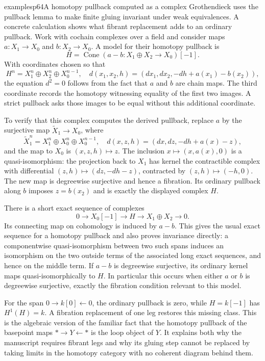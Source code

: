 \begin{dcomment}{examples}{p64}{A homotopy pullback computed as a complex}
Grothendieck uses the pullback lemma to make finite gluing invariant under weak equivalences. A concrete calculation shows what fibrant replacement adds to an ordinary pullback. Work with cochain complexes over a field and consider maps $a:X_1\to X_0$ and $b:X_2\to X_0$. A model for their homotopy pullback is
\[
 H=\operatorname{Cone}(a-b:X_1\oplus X_2\to X_0)[-1].
\]
With coordinates chosen so that
\[
 H^n=X_1^n\oplus X_2^n\oplus X_0^{n-1},
 \quad d(x_1,x_2,h)=(dx_1,dx_2,-dh+a(x_1)-b(x_2)),
\]
the equation $d^2=0$ follows from the fact that $a$ and $b$ are chain maps. The third coordinate records the homotopy witnessing equality of the first two images. A strict pullback asks those images to be equal without this additional coordinate.

To verify that this complex computes the derived pullback, replace $a$ by the surjective map $\widetilde X_1\to X_0$, where
\[
 \widetilde X_1^n=X_1^n\oplus X_0^n\oplus X_0^{n-1},
 \quad d(x,z,h)=(dx,dz,-dh+a(x)-z),
\]
and the map to $X_0$ is $(x,z,h)\mapsto z$. The inclusion $x\mapsto(x,a(x),0)$ is a quasi-isomorphism: the projection back to $X_1$ has kernel the contractible complex with differential $(z,h)\mapsto(dz,-dh-z)$, contracted by $(z,h)\mapsto(-h,0)$. The new map is degreewise surjective and hence a fibration. Its ordinary pullback along $b$ imposes $z=b(x_2)$ and is exactly the displayed complex $H$.

There is a short exact sequence of complexes
\[
 0\longrightarrow X_0[-1]\longrightarrow H
   \longrightarrow X_1\oplus X_2\longrightarrow0.
\]
Its connecting map on cohomology is induced by $a-b$. This gives the usual exact sequence for a homotopy pullback and also proves invariance directly: a componentwise quasi-isomorphism between two such spans induces an isomorphism on the two outside terms of the associated long exact sequences, and hence on the middle term. If $a-b$ is degreewise surjective, its ordinary kernel maps quasi-isomorphically to $H$. In particular this occurs when either $a$ or $b$ is degreewise surjective, exactly the fibration condition relevant to this model.

For the span $0\to k[0]\leftarrow0$, the ordinary pullback is zero, while $H=k[-1]$ has $H^1(H)=k$. A fibration replacement of one leg restores this missing class. This is the algebraic version of the familiar fact that the homotopy pullback of the basepoint maps $*\to Y\leftarrow *$ is the loop object of $Y$. It explains both why the manuscript requires fibrant legs and why its gluing step cannot be replaced by taking limits in the homotopy category with no coherent diagram behind them.


\end{dcomment}
